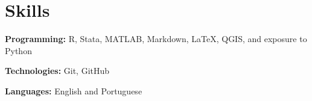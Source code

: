 \documentclass[letterpaper,11pt]{article}
\newcommand{\resumeSubHeadingListStart}{\begin{itemize}[leftmargin=0.15in, label={}]}
\newcommand{\resumeSubHeadingListEnd}{\end{itemize}}
\begin{document}
\section{Skills}
  \vspace{2pt}
  \resumeSubHeadingListStart
    \small{\item{
        \textbf{Programming:}{ R, Stata, MATLAB, Markdown, LaTeX, QGIS, and exposure to Python} \\ \vspace{3pt}
        
        \textbf{Technologies:}{ Git, GitHub} \\ \vspace{3pt}

        
        \textbf{Languages:}{ English and Portuguese}
        
    }}
  \resumeSubHeadingListEnd




        



\end{document}
